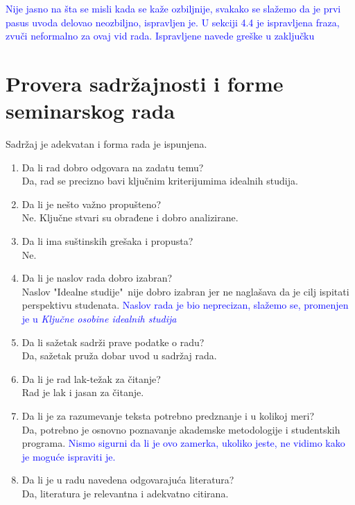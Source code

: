 \documentclass[a4paper]{report}
\newcommand{\odgovor}[1]{\textcolor{blue}{#1}}
\begin{document}
 \odgovor{Nije jasno na šta se misli kada se kaže ozbiljnije, svakako se slažemo da je prvi pasus uvoda delovao neozbiljno, ispravljen je. U sekciji 4.4 je ispravljena fraza, zvuči neformalno za ovaj vid rada. Ispravljene navede greške u zaključku }
 
 
 \section{Provera sadržajnosti i forme seminarskog rada}
 Sadržaj je adekvatan i forma rada je ispunjena.
 \begin{enumerate}
 \item Da li rad dobro odgovara na zadatu temu?\\
 
 Da, rad se precizno bavi ključnim kriterijumima idealnih studija.
 \item Da li je nešto važno propušteno?\\
 
 Ne. Ključne stvari su obrađene i dobro analizirane.
 \item Da li ima suštinskih grešaka i propusta?\\
 Ne.
 
 \item Da li je naslov rada dobro izabran?\\
 Naslov "Idealne studije"\ nije dobro izabran jer ne naglašava da je cilj ispitati perspektivu studenata.
 \odgovor{Naslov rada je bio neprecizan, slažemo se, promenjen je u \emph{Ključne osobine idealnih studija} }
 
 \item Da li sažetak sadrži prave podatke o radu?\\
 Da, sažetak pruža dobar uvod u sadržaj rada.
 
 \item Da li je rad lak-težak za čitanje?\\
 Rad je lak i jasan za čitanje.
 
 \item Da li je za razumevanje teksta potrebno predznanje i u kolikoj meri?\\
 Da, potrebno je osnovno poznavanje akademske metodologije i studentskih programa.
 \odgovor{Nismo sigurni da li je ovo zamerka, ukoliko jeste, ne vidimo kako je moguće ispraviti je.}
 
 \item Da li je u radu navedena odgovarajuća literatura?\\
 Da, literatura je relevantna i adekvatno citirana.
 

\end{enumerate}
\end{document}

